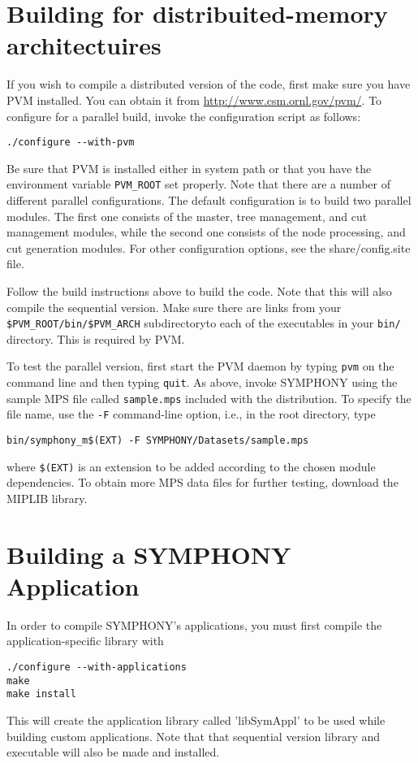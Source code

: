 \section{Building for distribuited-memory architectuires}

If you wish to compile a distributed version of the code, first make sure
you have PVM installed. You can obtain it from
\url{http://www.csm.ornl.gov/pvm/}. To configure for a parallel build, invoke
the configuration script as follows:
\begin{verbatim}
./configure --with-pvm
\end{verbatim}
Be sure that PVM is installed either in system path or that you have the
environment variable \texttt{PVM\_ROOT} set properly. Note that there are a
number of different parallel configurations. The default configuration is to
build two parallel modules. The first one consists of the master, tree
management, and cut management modules, while the second one consists of the
node processing, and cut generation modules. For other configuration options,
see the share/config.site file.

Follow the build instructions above to build the code. Note that this will
also compile the sequential version. Make sure there are links from your
\texttt{\$PVM\_ROOT/bin/\$PVM\_ARCH} subdirectoryto each of the executables in
your \texttt{bin/} directory. This is required by PVM.

To test the parallel version, first start the PVM daemon by typing
\texttt{pvm} on the command line and then typing \texttt{quit}. As above,
invoke SYMPHONY using the sample MPS file called \texttt{sample.mps} included
with the distribution. To specify the file name, use the \texttt{-F}
command-line option, i.e., in the root directory, type
\begin{verbatim}
bin/symphony_m$(EXT) -F SYMPHONY/Datasets/sample.mps 
\end{verbatim}
where \texttt{\$(EXT)} is an extension to be added according to the chosen
module dependencies. To obtain more MPS data files for further testing,
download the MIPLIB library.

\section{Building a SYMPHONY Application}

In order to compile SYMPHONY's applications, you must first compile the 
application-specific library with
\begin{verbatim}
./configure --with-applications
make 
make install
\end{verbatim}
This will create the application library called 'libSymAppl' to be used while
building custom applications. Note that that sequential version library and
executable will also be made and installed.

